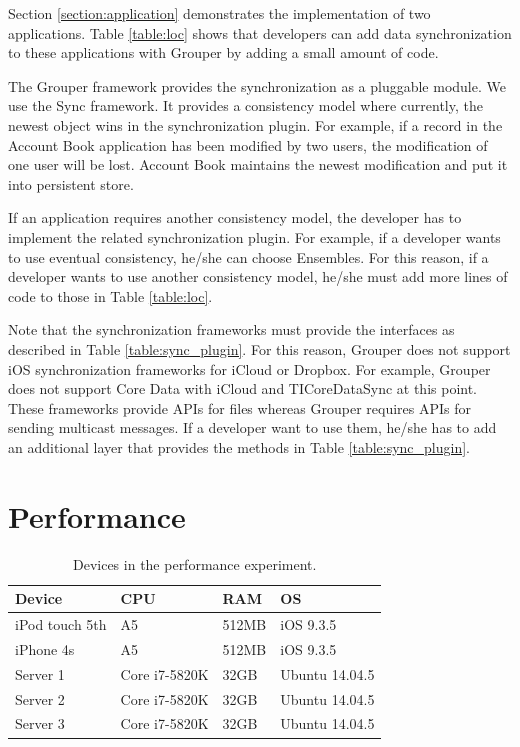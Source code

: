 \documentclass[a4paper,11pt]{report}
\begin{document}
Section \ref{section:application} demonstrates the implementation of two applications.
Table \ref{table:loc} shows that developers can add data synchronization to these applications with Grouper by adding a small amount of code. 

The Grouper framework provides the synchronization as a pluggable module.
We use the Sync\cite{sync} framework.
It provides a consistency model where currently, the newest object wins in the synchronization plugin.
For example, if a record in the Account Book application has been modified by two users, the modification of one user will be lost.
Account Book maintains the newest modification and put it into persistent store.

If an application requires another consistency model, the developer has to implement the related synchronization plugin.
For example, if a developer wants to use eventual consistency, he/she can choose Ensembles\cite{ensembles}.
For this reason, if a developer wants to use another consistency model, he/she must add more lines of code to those in Table \ref{table:loc}.

Note that the synchronization frameworks must provide the interfaces as described in Table \ref{table:sync_plugin}.
For this reason, Grouper does not support iOS synchronization frameworks for iCloud or Dropbox.
For example, Grouper does not support Core Data with iCloud\cite{coredata} and TICoreDataSync\cite{ticoredatasyn} at this point.
These frameworks provide APIs for files whereas Grouper requires APIs for sending multicast messages.
If a developer want to use them, he/she has to add an additional layer that provides the methods in Table \ref{table:sync_plugin}.

\section{Performance} \label{section:performance}

\begin{table}[t]
	\centering  
	\begin{tabular}{llll}
		\toprule
		\textbf{Device} & \textbf{CPU} & \textbf{RAM} & \textbf{OS} \\ 
		\midrule
		iPod touch 5th & A5 & 512MB & iOS 9.3.5 \\
		iPhone 4s & A5 & 512MB & iOS 9.3.5 \\
		Server 1 & Core i7-5820K & 32GB & Ubuntu 14.04.5 \\
		Server 2 & Core i7-5820K & 32GB & Ubuntu 14.04.5 \\
		Server 3 & Core i7-5820K & 32GB & Ubuntu 14.04.5 \\ 
		\bottomrule
	\end{tabular}
	\caption{Devices in the performance experiment.}
	\label{table:experiment_devices}
\end{table}
\end{document}
